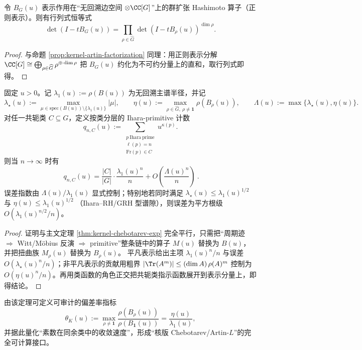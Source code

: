 \begin{proposition}\label{prop:ihara-artin-factorization}
令 \(B_{G}(u)\) 表示作用在“无回溯边空间 \(\otimes\CC[G]\)”上的群扩张 Hashimoto 算子（正则表示）。则有行列式恒等式
\[
\det(I-tB_{G}(u))=\prod_{\rho\in\widehat G}\det(I-tB_{\rho}(u))^{\dim\rho}.
\]
\end{proposition}

\begin{proof}
与命题 \ref{prop:kernel-artin-factorization} 同理：用正则表示分解
\(
\CC[G]\cong\bigoplus_{\rho\in\widehat G}\rho^{\oplus \dim\rho}
\)
把 \(B_G(u)\) 约化为不可约分量上的直和，取行列式即得。
\end{proof}

\begin{theorem}\label{thm:ihara-chebotarev-exp}
固定 \(u>0\)。记 \(\lambda_1(u):=\rho(B(u))\) 为无回溯主谱半径，并记
\[
\lambda_\star(u):=\max_{\mu\in\mathrm{spec}(B(u))\setminus\{\lambda_1(u)\}}|\mu|,
\qquad
\eta(u):=\max_{\rho\in\widehat G,\ \rho\neq\mathbf 1}\rho(B_\rho(u)),
\qquad
\Lambda(u):=\max\{\lambda_\star(u),\eta(u)\}.
\]
对任一共轭类 \(C\subseteq G\)，定义按类分层的 Ihara-primitive 计数
\[
q_{n,C}(u):=\sum_{\substack{p\ \mathrm{Ihara\ prime}\\ \ell(p)=n\\ \mathrm{Fr}(p)\in C}}u^{\kappa(p)}.
\]
则当 \(n\to\infty\) 时有
\[
\boxed{\ 
q_{n,C}(u)=\frac{|C|}{|G|}\cdot\frac{\lambda_1(u)^n}{n}
+O\!\left(\frac{\Lambda(u)^n}{n}\right)\ }.
\]
误差指数由 \(\Lambda(u)/\lambda_1(u)\) 显式控制；特别地若同时满足
\(
\lambda_\star(u)\le \lambda_1(u)^{1/2}
\)
与
\(
\eta(u)\le \lambda_1(u)^{1/2}
\)
（Ihara--RH/GRH 型谱隙），则误差为平方根级
\(
O(\lambda_1(u)^{n/2}/n)
\)。
\end{theorem}

\begin{proof}
证明与主文定理 \ref{thm:kernel-chebotarev-exp} 完全平行，只需把“周期迹 \(\Rightarrow\) Witt/Möbius 反演 \(\Rightarrow\) primitive”整条链中的算子 \(M(u)\) 替换为 \(B(u)\)，并把扭曲族 \(M_\rho(u)\) 替换为 \(B_\rho(u)\)。
平凡表示给出主项 \(\lambda_1(u)^n/n\) 与误差 \(O(\lambda_\star(u)^n/n)\)；非平凡表示的贡献用粗界
\(
|\Tr(A^m)|\le (\dim A)\,\rho(A)^m
\)
控制为 \(O(\eta(u)^n/n)\)。再用类函数的角色正交把共轭类指示函数展开到表示分量上，即得结论。
\end{proof}

由该定理可定义可审计的偏差率指标
\[
\theta_K(u):=\max_{\rho\neq\mathbf 1}\frac{\rho(B_\rho(u))}{\rho(B_{\mathbf 1}(u))}
=\frac{\eta(u)}{\lambda_1(u)},
\]
并据此量化“素数在同余类中的收敛速度”，形成“核版 Chebotarev/Artin-\(L\)”的完全可计算接口。

